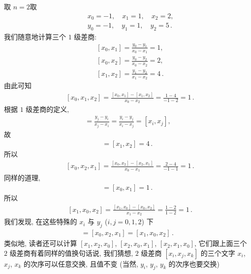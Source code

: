 \begin{example}
    取 $n = 2$\period 取
    \begin{align*}
         & x_0 = -1, \quad x_1 = 1, \quad x_2 = 2,        \\
         & y_0 = -1, \quad y_1 = 1, \quad y_2 = 5 \period
    \end{align*}
    我们随意地计算三个 $1$ 级差商:
    \begin{align*}
         & [x_0, x_1] = \frac{y_0 - y_1}{x_0 - x_1} = 1,        \\
         & [x_0, x_2] = \frac{y_0 - y_2}{x_0 - x_2} = 2,        \\
         & [x_1, x_2] = \frac{y_1 - y_2}{x_1 - x_2} = 4 \period
    \end{align*}
    由此可知
    \begin{align*}
         & [x_0, x_1, x_2] = \frac{[x_0, x_1] - [x_1, x_2]}{x_0 - x_2} = \frac{1 - 4}{-1 - 2} = 1 \period
    \end{align*}
    根据 $1$ 级差商的定义,
    \begin{align*}
        [x_j, x_i] = \frac{y_j - y_i}{x_j - x_i} = \frac{y_i - y_j}{x_i - x_j} = [x_i, x_j],
    \end{align*}
    故
    \begin{align*}
        [x_2, x_1] = [x_1, x_2] = 4 \period
    \end{align*}
    所以
    \begin{align*}
         & [x_0, x_2, x_1] = \frac{[x_0, x_2] - [x_2, x_1]}{x_0 - x_1} = \frac{2 - 4}{-1 - 1} = 1 \period
    \end{align*}
    同样的道理,
    \begin{align*}
        [x_1, x_0] = [x_0, x_1] = 1 \period
    \end{align*}
    所以
    \begin{align*}
         & [x_1, x_0, x_2] = \frac{[x_1, x_0] - [x_0, x_2]}{x_1 - x_2} = \frac{1 - 2}{1 - 2} = 1 \period
    \end{align*}
    我们发现, 在这些特殊的 $x_i$ 与 $y_j$ ($i,j = 0,1,2$) 下
    \begin{align*}
        [x_0, x_1, x_2] = [x_0, x_2, x_1] = [x_1, x_0, x_2] \period
    \end{align*}
    类似地, 读者还可以计算 $[x_1, x_2, x_0]$, $[x_2, x_0, x_1]$, $[x_2, x_1, x_0]$, 它们跟上面三个 $2$ 级差商有着同样的值\period 换句话说, 我们猜想, $2$ 级差商 $[x_i, x_j, x_k]$ 的三个文字 $x_i$, $x_j$, $x_k$ 的次序可以任意交换, 且值不变 (当然, $y_i$, $y_j$, $y_k$ 的次序也要交换)\period
\end{example}

